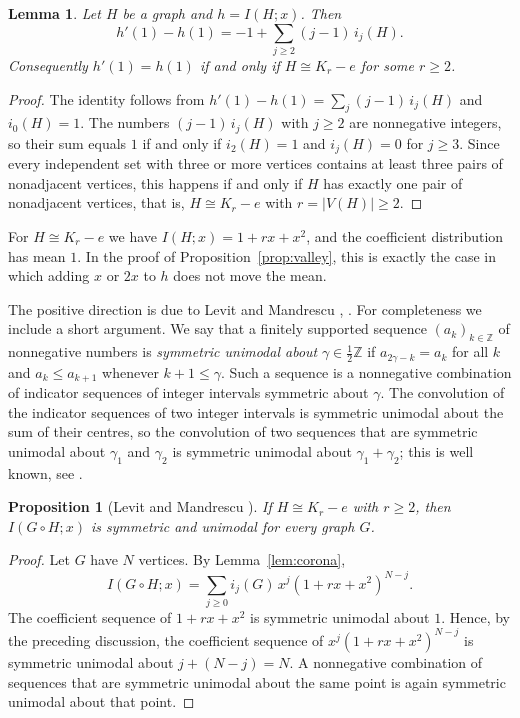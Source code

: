 \documentclass[11pt]{amsart}
\newtheorem{proposition}[theorem]{Proposition}
\newtheorem{lemma}[theorem]{Lemma}
\theoremstyle{remark}
\numberwithin{equation}{section}
\newcommand{\cor}{\circ}
\begin{document}
\begin{lemma}\label{lem:mean}
Let $H$ be a graph and $h=I(H;x)$. Then
\[
h'(1)-h(1)=-1+\sum_{j\ge 2}(j-1)\,i_j(H).
\]
Consequently $h'(1)=h(1)$ if and only if $H\cong K_r-e$ for some $r\ge 2$.
\end{lemma}

\begin{proof}
The identity follows from $h'(1)-h(1)=\sum_j(j-1)\,i_j(H)$ and $i_0(H)=1$. The numbers $(j-1)\,i_j(H)$ with $j\ge 2$ are nonnegative integers, so their sum equals $1$ if and only if $i_2(H)=1$ and $i_j(H)=0$ for $j\ge 3$. Since every independent set with three or more vertices contains at least three pairs of nonadjacent vertices, this happens if and only if $H$ has exactly one pair of nonadjacent vertices, that is, $H\cong K_r-e$ with $r=|V(H)|\ge 2$.
\end{proof}

For $H\cong K_r-e$ we have $I(H;x)=1+rx+x^2$, and the coefficient distribution has mean $1$. In the proof of Proposition~\ref{prop:valley}, this is exactly the case in which adding $x$ or $2x$ to $h$ does not move the mean.

The positive direction is due to Levit and Mandrescu \cite[Theorem~2.9]{LM13}, \cite[Theorem~4.3]{LM16}. For completeness we include a short argument. We say that a finitely supported sequence $(a_k)_{k\in\mathbb{Z}}$ of nonnegative numbers is \emph{symmetric unimodal about} $\gamma\in\frac12\mathbb{Z}$ if $a_{2\gamma-k}=a_k$ for all $k$ and $a_k\le a_{k+1}$ whenever $k+1\le\gamma$. Such a sequence is a nonnegative combination of indicator sequences of integer intervals symmetric about $\gamma$. The convolution of the indicator sequences of two integer intervals is symmetric unimodal about the sum of their centres, so the convolution of two sequences that are symmetric unimodal about $\gamma_1$ and $\gamma_2$ is symmetric unimodal about $\gamma_1+\gamma_2$; this is well known, see \cite{And76}.

\begin{proposition}[Levit and Mandrescu \cite{LM13,LM16}]\label{prop:positive}
If $H\cong K_r-e$ with $r\ge 2$, then $I(G\cor H;x)$ is symmetric and unimodal for every graph $G$.
\end{proposition}

\begin{proof}
Let $G$ have $N$ vertices. By Lemma~\ref{lem:corona},
\[
I(G\cor H;x)=\sum_{j\ge 0} i_j(G)\,x^j(1+rx+x^2)^{N-j}.
\]
The coefficient sequence of $1+rx+x^2$ is symmetric unimodal about $1$. Hence, by the preceding discussion, the coefficient sequence of $x^j(1+rx+x^2)^{N-j}$ is symmetric unimodal about $j+(N-j)=N$. A nonnegative combination of sequences that are symmetric unimodal about the same point is again symmetric unimodal about that point.
\end{proof}
\end{document}
